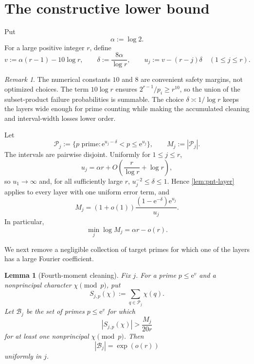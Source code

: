 \documentclass[11pt]{amsart}
\newtheorem{lemma}[lemma]{Lemma}
\theoremstyle{definition}
\theoremstyle{remark}
\newtheorem{remark}[remark]{Remark}
\numberwithin{equation}{section}
\newcommand{\e}{\mathrm e}
\newcommand{\Pcal}{\mathcal P}
\newcommand{\Bcal}{\mathcal B}
\begin{document}
\section{The constructive lower bound}

Put
\[
 \alpha:=\log 2.
\]
For a large positive integer $r$, define
\begin{equation}\label{eq:lower-parameters}
 v:=\alpha(r-1)-10\log r,
 \qquad
 \delta:=\frac{8\alpha}{\log r},
 \qquad
 u_j:=v-(r-j)\delta\quad(1\le j\le r).
\end{equation}
\begin{remark}\label{rem:lower-constants}
The numerical constants $10$ and $8$ are convenient safety margins, not
optimized choices.  The term $10\log r$ ensures
$2^{r-1}/p_i\ge r^{10}$, so the union of the subset-product failure
probabilities is summable.  The choice $\delta\asymp1/\log r$ keeps the
layers wide enough for prime counting while making the accumulated
cleaning and interval-width losses lower order.
\end{remark}
Let
\begin{equation}\label{eq:prime-layers}
 \Pcal_j:=\{p\text{ prime}:\e^{u_j-\delta}<p\le\e^{u_j}\},
 \qquad M_j:=|\Pcal_j|.
\end{equation}
The intervals are pairwise disjoint.  Uniformly for $1\le j\le r$,
\[
 u_j=\alpha r+O\!\left(\frac r{\log r}+\log r\right),
\]
so $u_1\to\infty$ and, for all sufficiently large $r$,
$u_j^{-2}\le\delta\le1$.  Hence \cref{lem:pnt-layer} applies to every
layer with one uniform error term, and
\begin{equation}\label{eq:Mj-asymp}
 M_j=(1+o(1))\frac{(1-\e^{-\delta})\e^{u_j}}{u_j}.
\end{equation}
In particular,
\begin{equation}\label{eq:Mj-exponential}
 \min_j\log M_j=\alpha r-o(r).
\end{equation}

We next remove a negligible collection of target primes for which one of the layers has a large Fourier coefficient.

\begin{lemma}[Fourth-moment cleaning]\label{lem:fourth-moment}
Fix $j$.  For a prime $p\le\e^v$ and a nonprincipal character $\chi\pmod p$, put
\[
 S_{j,p}(\chi):=\sum_{q\in\Pcal_j}\chi(q).
\]
Let $\Bcal_j$ be the set of primes $p\le\e^v$ for which
\[
 |S_{j,p}(\chi)|>\frac{M_j}{20r}
\]
for at least one nonprincipal $\chi\pmod p$.  Then
\[
 |\Bcal_j|=\exp(o(r))
\]
uniformly in $j$.
\end{lemma}
\end{document}
